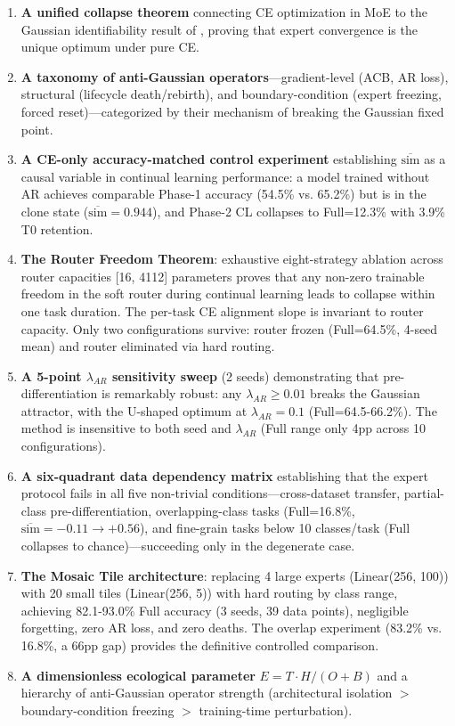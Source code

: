 \documentclass[twoside]{article}
\theoremstyle{definition}
\begin{document}
\begin{enumerate}
    \item \textbf{A unified collapse theorem} connecting CE optimization in MoE to the Gaussian identifiability result of \cite{klindt2026}, proving that expert convergence is the unique optimum under pure CE.

    \item \textbf{A taxonomy of anti-Gaussian operators}---gradient-level (ACB, AR loss), structural (lifecycle death/rebirth), and boundary-condition (expert freezing, forced reset)---categorized by their mechanism of breaking the Gaussian fixed point.

    \item \textbf{A CE-only accuracy-matched control experiment} establishing $\overline{\text{sim}}$ as a causal variable in continual learning performance: a model trained without AR achieves comparable Phase-1 accuracy (54.5\% vs. 65.2\%) but is in the clone state ($\overline{\text{sim}}=0.944$), and Phase-2 CL collapses to Full=12.3\% with 3.9\% T0 retention.

    \item \textbf{The Router Freedom Theorem}: exhaustive eight-strategy ablation across router capacities [16, 4112] parameters proves that any non-zero trainable freedom in the soft router during continual learning leads to collapse within one task duration. The per-task CE alignment slope is invariant to router capacity. Only two configurations survive: router frozen (Full=64.5\%, 4-seed mean) and router eliminated via hard routing.

    \item \textbf{A 5-point $\lambda_{AR}$ sensitivity sweep} (2 seeds) demonstrating that pre-differentiation is remarkably robust: any $\lambda_{AR} \geq 0.01$ breaks the Gaussian attractor, with the U-shaped optimum at $\lambda_{AR}=0.1$ (Full=64.5-66.2\%). The method is insensitive to both seed and $\lambda_{AR}$ (Full range only 4pp across 10 configurations).

    \item \textbf{A six-quadrant data dependency matrix} establishing that the expert protocol fails in all five non-trivial conditions---cross-dataset transfer, partial-class pre-differentiation, overlapping-class tasks (Full=16.8\%, $\overline{\text{sim}}=-0.11\rightarrow+0.56$), and fine-grain tasks below 10 classes/task (Full collapses to chance)---succeeding only in the degenerate case.

    \item \textbf{The Mosaic Tile architecture}: replacing 4 large experts (Linear(256, 100)) with 20 small tiles (Linear(256, 5)) with hard routing by class range, achieving 82.1-93.0\% Full accuracy (3 seeds, 39 data points), negligible forgetting, zero AR loss, and zero deaths. The overlap experiment (83.2\% vs. 16.8\%, a 66pp gap) provides the definitive controlled comparison.

    \item \textbf{A dimensionless ecological parameter} $E = T \cdot H / (O + B)$ and a hierarchy of anti-Gaussian operator strength (architectural isolation $>$ boundary-condition freezing $>$ training-time perturbation).
\end{enumerate}
\end{document}
